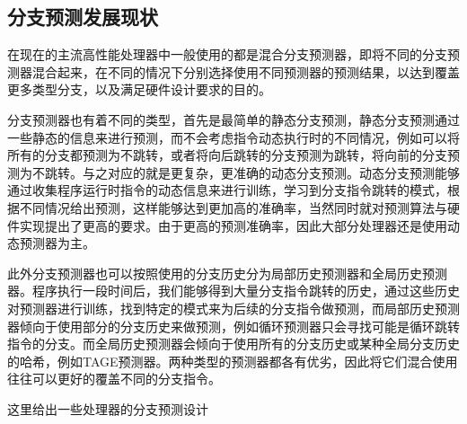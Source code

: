 \subsection{分支预测发展现状}

在现在的主流高性能处理器中一般使用的都是混合分支预测器，即将不同的分支预测器混合起来，在不同的情况下分别选择使用不同预测器的预测结果，以达到覆盖更多类型分支，以及满足硬件设计要求的目的。

分支预测器也有着不同的类型，首先是最简单的静态分支预测，静态分支预测通过一些静态的信息来进行预测，而不会考虑指令动态执行时的不同情况，例如可以将所有的分支都预测为不跳转，或者将向后跳转的分支预测为跳转，将向前的分支预测为不跳转。与之对应的就是更复杂，更准确的动态分支预测。动态分支预测能够通过收集程序运行时指令的动态信息来进行训练，学习到分支指令跳转的模式，根据不同情况给出预测，这样能够达到更加高的准确率，当然同时就对预测算法与硬件实现提出了更高的要求。由于更高的预测准确率，因此大部分处理器还是使用动态预测器为主。

此外分支预测器也可以按照使用的分支历史分为局部历史预测器和全局历史预测器。程序执行一段时间后，我们能够得到大量分支指令跳转的历史，通过这些历史对预测器进行训练，找到特定的模式来为后续的分支指令做预测，而局部历史预测器倾向于使用部分的分支历史来做预测，例如循环预测器只会寻找可能是循环跳转指令的分支\cite{barnes2009patchmatch}。而全局历史预测器会倾向于使用所有的分支历史或某种全局分支历史的哈希，例如TAGE预测器。两种类型的预测器都各有优劣，因此将它们混合使用往往可以更好的覆盖不同的分支指令。

这里给出一些处理器的分支预测设计




